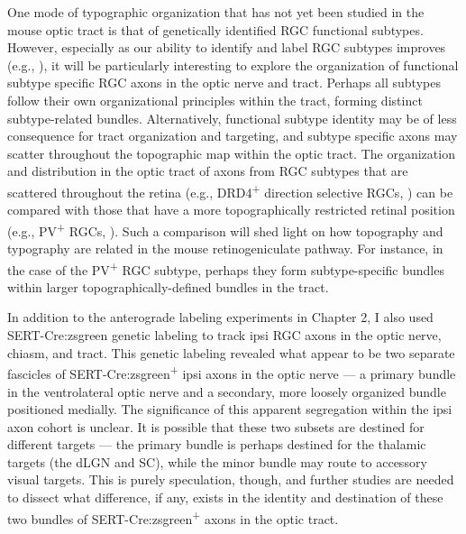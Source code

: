 One mode of typographic organization that has not yet been studied in the mouse optic tract is that of genetically identified RGC functional subtypes.
However, especially as our ability to identify and label RGC subtypes improves (e.g., ), it will be particularly interesting to explore the organization of functional subtype specific RGC axons in the optic nerve and tract.
Perhaps all subtypes follow their own organizational principles within the tract, forming distinct subtype-related bundles.
Alternatively, functional subtype identity may be of less consequence for tract organization and targeting, and subtype specific axons may scatter throughout the topographic map within the optic tract.
The organization and distribution in the optic tract of axons from RGC subtypes that are scattered throughout the retina (e.g., DRD4\textsuperscript{+} direction selective RGCs, ) can be compared with those that have a more topographically restricted retinal position (e.g., PV\textsuperscript{+} RGCs, ).
Such a comparison will shed light on how topography and typography are related in the mouse retinogeniculate pathway.
For instance, in the case of the PV\textsuperscript{+} RGC subtype, perhaps they form subtype-specific bundles within larger topographically-defined bundles in the tract.

In addition to the anterograde labeling experiments in Chapter 2, I also used SERT-Cre:zsgreen genetic labeling to track ipsi RGC axons in the optic nerve, chiasm, and tract.
This genetic labeling revealed what appear to be two separate fascicles of SERT-Cre:zsgreen\textsuperscript{+} ipsi axons in the optic nerve --- a primary bundle in the ventrolateral optic nerve and a secondary, more loosely organized bundle positioned medially.
The significance of this apparent segregation within the ipsi axon cohort is unclear.
It is possible that these two subsets are destined for different targets --- the primary bundle is perhaps destined for the thalamic targets (the dLGN and SC), while the minor bundle may route to accessory visual targets.
This is purely speculation, though, and further studies are needed to dissect what difference, if any, exists in the identity and destination of these two bundles of SERT-Cre:zsgreen\textsuperscript{+} axons in the optic tract.


